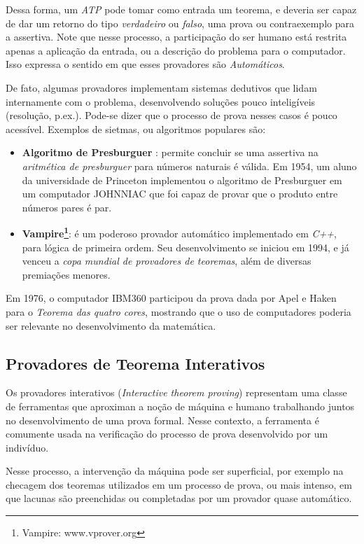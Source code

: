 Dessa forma, um \textit{ATP} pode tomar como entrada um teorema, e deveria ser capaz de dar um retorno do tipo \textit{verdadeiro} ou \textit{falso}, uma prova ou contraexemplo para a assertiva.
Note que nesse processo, a participação do ser humano está restrita apenas a aplicação da entrada, ou a descrição do problema para o computador.
Isso expressa o sentido em que esses provadores são \textit{Automáticos}.

De fato, algumas provadores implementam sistemas dedutivos que lidam internamente com o problema, desenvolvendo soluções pouco inteligíveis (resolução, p.ex.).
Pode-se dizer que o processo de prova nesses casos é pouco acessível. Exemplos de sietmas, ou algoritmos populares são:

\begin{itemize}
    \item \textbf{Algoritmo de Presburguer} : permite concluir se uma assertiva na \textit{aritmética de presburguer} para números naturais é válida. Em 1954, um aluno da universidade de Princeton implementou o algoritmo de Presburguer em um computador JOHNNIAC que foi capaz de provar que o produto entre números pares é par.
    \item \textbf{Vampire\footnote{Vampire: www.vprover.org}}: é um poderoso provador automático implementado em \textit{C++}, para lógica de primeira ordem. Seu desenvolvimento se iniciou em 1994, e já venceu a \textit{copa mundial de provadores de teoremas}, além de diversas premiações menores.
\end{itemize}

Em 1976, o computador IBM360 participou da prova dada por Apel e Haken para o \textit{Teorema das quatro cores}, mostrando que o uso de computadores poderia ser relevante no desenvolvimento da matemática.

\subsection{Provadores de Teorema Interativos}

Os provadores interativos (\textit{Interactive theorem proving}) representam uma classe de ferramentas que aproximan a noção de máquina e humano trabalhando juntos no desenvolvimento de uma prova formal.
Nesse contexto, a ferramenta é comumente usada na verificação do processo de prova desenvolvido por um indivíduo.

Nesse processo, a intervenção da máquina pode ser superficial, por exemplo na checagem dos teoremas utilizados em um processo de prova, ou mais intenso, em que lacunas são preenchidas ou completadas por um provador quase automático.

